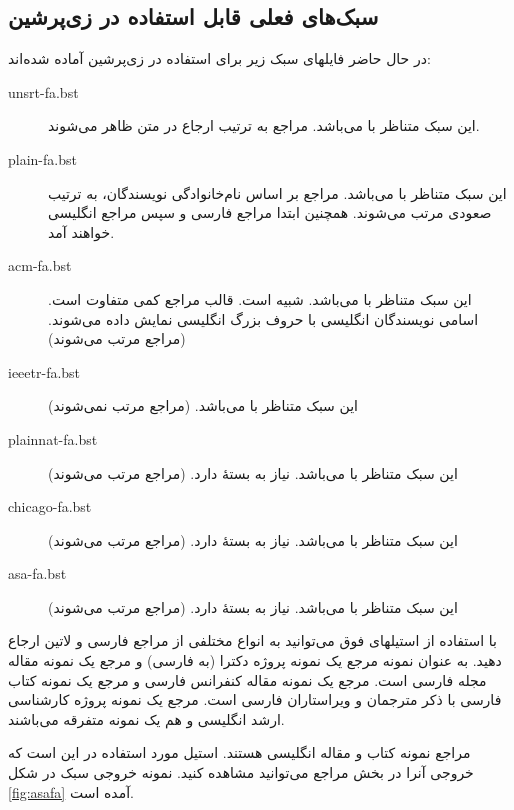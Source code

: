 \subsection{سبک‌های فعلی قابل استفاده در زی‌پرشین}
در حال حاضر فایلهای سبک زیر برای استفاده در زی‌پرشین آماده شده‌اند:

\singlespacing
\begin{description}
\item [unsrt-fa.bst] این سبک متناظر با  می‌باشد. مراجع به ترتیب ارجاع در متن ظاهر می‌شوند.
\item [plain-fa.bst] این سبک متناظر با  می‌باشد. مراجع بر اساس نام‌خانوادگی نویسندگان، به ترتیب صعودی مرتب می‌شوند.
 همچنین ابتدا مراجع فارسی و سپس مراجع انگلیسی خواهند آمد.
\item [acm-fa.bst] این سبک متناظر با  می‌باشد. شبیه  است.  قالب مراجع کمی متفاوت است. اسامی نویسندگان انگلیسی با حروف بزرگ انگلیسی نمایش داده می‌شوند. (مراجع مرتب می‌شوند)
\item [ieeetr-fa.bst] این سبک متناظر با  می‌باشد. (مراجع مرتب نمی‌شوند)
\item [plainnat-fa.bst] این سبک متناظر با  می‌باشد. نیاز به بستهٔ  دارد. (مراجع مرتب می‌شوند)
\item [chicago-fa.bst] این سبک متناظر با  می‌باشد. نیاز به بستهٔ  دارد. (مراجع مرتب می‌شوند)
\item [asa-fa.bst] این سبک متناظر با  می‌باشد. نیاز به بستهٔ  دارد. (مراجع مرتب می‌شوند)
\end{description}
\doublespacing

با استفاده از استیلهای فوق می‌توانید به انواع مختلفی از مراجع فارسی و لاتین ارجاع دهید. به عنوان نمونه مرجع 
\cite{Omidali82phdThesis}
 یک نمونه پروژه دکترا (به فارسی) و مرجع 
\cite{Vahedi87} یک نمونه مقاله مجله فارسی است.
مرجع 
\cite{Amintoosi87afzayesh}  یک نمونه  مقاله کنفرانس فارسی و
مرجع 
\cite{Pedram80osool} یک نمونه کتاب فارسی با ذکر مترجمان و ویراستاران فارسی است. مرجع 
\cite{Khalighi07MscThesis} یک نمونه پروژه کارشناسی ارشد انگلیسی و
\cite{Khalighi87xepersian} هم یک نمونه متفرقه  می‌باشند.

مراجع 
\cite{Gonzalez02book,Baker02limits} 
نمونه کتاب و مقاله انگلیسی هستند.
استیل مورد استفاده در این \پ  است که خروجی آنرا در بخش مراجع می‌توانید مشاهده کنید.
نمونه  خروجی سبک  در شکل \ref{fig:asafa} آمده است.

